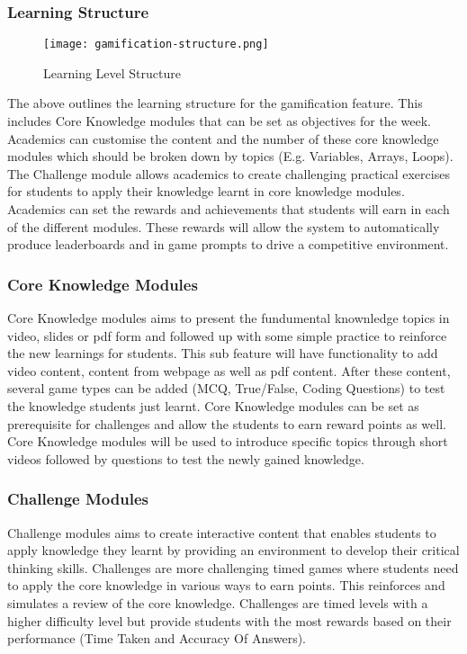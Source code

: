 \subsubsection{Learning Structure}
\begin{figure}[h!]
    \texttt{[image: gamification-structure.png]}
    \centering
    \caption{Learning Level Structure}
\end{figure}

The above outlines the learning structure for the gamification feature. This includes Core Knowledge modules that can be set as objectives for the week. Academics can customise the content and the number of these core knowledge modules which should be broken down by topics (E.g. Variables, Arrays, Loops). The Challenge module allows academics to create challenging practical exercises for students to apply their knowledge learnt in core knowledge modules. Academics can set the rewards and achievements that students will earn in each of the different modules. These rewards will allow the system to automatically produce leaderboards and in game prompts to drive a competitive environment.

\subsubsection{Core Knowledge Modules}
Core Knowledge modules aims to present the fundumental knownledge topics in video, slides or pdf form and followed up with some simple practice to reinforce the new learnings for students.
This sub feature will have functionality to add video content, content from webpage as well as pdf content. After these content, several game types can be added (MCQ, True/False, Coding Questions) to test the knowledge students just learnt. Core Knowledge modules can be set as prerequisite for challenges and allow the students to earn reward points as well. Core Knowledge modules will be used to introduce specific topics through short videos followed by questions to test the newly gained knowledge. 

\subsubsection{Challenge Modules}
Challenge modules aims to create interactive content that enables students to apply knowledge they learnt by providing an environment to develop their critical thinking skills.
Challenges are more challenging timed games where students need to apply the core knowledge in various ways to earn points. This reinforces and simulates a review of the core knowledge. Challenges are timed levels with a higher difficulty level but provide students with the most rewards based on their performance (Time Taken and Accuracy Of Answers).


